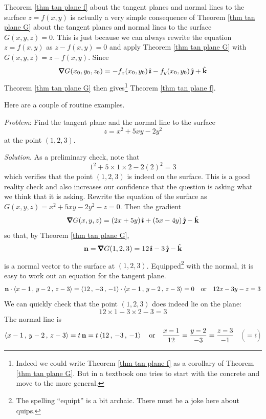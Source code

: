 \begin{remark}\label{rem tan plane}
Theorem \ref{thm tan plane f} about the tangent planes and normal lines
to the surface $z=f(x,y)$ is actually a very simple consequence of
Theorem \ref{thm tan plane G} about the tangent planes and normal lines
to the surface $G(x,y,z)=0$. This is just because we can always 
rewrite the equation $z=f(x,y)$ as $z-f(x,y)=0$ and apply
Theorem \ref{thm tan plane G} with $G(x,y,z)=z-f(x,y)$. Since
\begin{equation*}
\vnabla G(x_0,y_0,z_0) = -f_x(x_0,y_0)\,\hi -f_y(x_0,y_0)\,\hj +\hk
\end{equation*}
Theorem \ref{thm tan plane G} then gives\footnote{Indeed we could write 
Theorem \ref{thm tan plane f} as a corollary of Theorem \ref{thm tan plane G}.
But in a textbook one tries to start with the concrete and move to the more
general.} 
Theorem \ref{thm tan plane f}.
\end{remark}

Here are a couple of routine examples.
\begin{eg}\label{eg tan plane C}
\noindent\textit{Problem}:
Find the tangent plane and the normal line to the surface
\begin{equation*}
z= x^2+5xy-2y^2
\end{equation*}
at the point $(1,2,3)$.

\medskip
\noindent\textit{Solution}. 
As a preliminary check, note that
\begin{equation*}
1^2+5\times 1\times 2-2(2)^2=3
\end{equation*} 
which verifies that the point $(1,2,3)$ is indeed on the surface.
This is a good reality check and also increases our confidence that the
question is asking what we think that it is asking.
Rewrite the equation of the surface as $G(x,y,z)=x^2+5xy-2y^2-z=0$.
Then the gradient
\begin{align*}
\vnabla G(x,y,z) = (2x+5y)\,\hi +(5x-4y)\,\hj-\hk
\end{align*}
so that, by Theorem \ref{thm tan plane G},
\begin{equation*}
\vn = \vnabla G(1,2,3) = 12\,\hi -3\,\hj-\hk
\end{equation*}
is a normal vector to the surface at $(1,2,3)$.
Equipped\footnote{The spelling ``equipt'' is a bit archaic. There must 
be a joke here about quips.} with the normal, it is easy to work out an equation for
the tangent plane.
\begin{equation*}
\mathbf{n}\cdot\left< x-1\,,\,y-2\,,\,z-3 \right>
=\left< 12\,,\,-3\,,\, -1\right>\cdot\left< x-1\,,\,y-2\,,\,z-3 \right>
=0\quad\text{or}\quad
12x -3y -z = 3
\end{equation*}
We can quickly check that the point $(1,2,3)$ does indeed lie on the plane:
\begin{equation*}
12\times 1 -3\times 2 -3 = 3
\end{equation*}
The normal line is
\begin{equation*}
\llt x-1\,,\,y-2\,,\,z-3 \rgt
=t\,\vn = t\llt 12\,,\,-3\,,\, -1\rgt
\quad\text{or}\quad
\frac{x-1}{12} = \frac{y-2}{-3} = \frac{z-3}{-1}\quad 
  \textcolor{gray}{\Big(=t\Big)}
\end{equation*} 

\end{eg}

